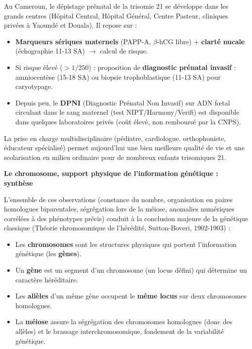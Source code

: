 \documentclass[11pt]{article}
\begin{document}
\begin{savaistu}
Au Cameroun, le dépistage prénatal de la trisomie 21 se développe dans les grands centres (Hôpital Central, Hôpital Général, Centre Pasteur, cliniques privées à Yaoundé et Douala). Il repose sur :
\begin{itemize}
    \item \textbf{Marqueurs sériques maternels} (PAPP-A, $\beta$-hCG libre) + \textbf{clarté nucale} (échographie 11-13 SA) $\rightarrow$ calcul de risque.
    \item Si risque élevé ($> 1/250$) : proposition de \textbf{diagnostic prénatal invasif} : amniocentèse (15-18 SA) ou biopsie trophoblastique (11-13 SA) pour caryotypage.
    \item Depuis peu, le \textbf{DPNI} (Diagnostic Prénatal Non Invasif) sur ADN fœtal circulant dans le sang maternel (test NIPT/Harmony/Verifi) est disponible dans quelques laboratoires privés (coût élevé, non remboursé par la CNPS).
\end{itemize}
La prise en charge multidisciplinaire (pédiatre, cardiologue, orthophoniste, éducateur spécialisé) permet aujourd'hui une bien meilleure qualité de vie et une scolarisation en milieu ordinaire pour de nombreux enfants trisomiques 21.
\end{savaistu}

\textbf{Le chromosome, support physique de l'information génétique : synthèse}\par

L'ensemble de ces observations (constance du nombre, organisation en paires homologues biparentales, ségrégation lors de la méiose, anomalies numériques corrélées à des phénotypes précis) conduit à la conclusion majeure de la génétique classique (Théorie chromosomique de l'hérédité, Sutton-Boveri, 1902-1903) :

\begin{propriete}
\begin{itemize}
    \item Les \textbf{chromosomes} sont les structures physiques qui portent l'information génétique (les \textbf{gènes}).
    \item Un \textbf{gène} est un segment d'un chromosome (un locus défini) qui détermine un caractère héréditaire.
    \item Les \textbf{allèles} d'un même gène occupent le \textbf{même locus} sur deux chromosomes homologues.
    \item La \textbf{méiose} assure la ségrégation des chromosomes homologues (donc des allèles) et le brassage interchromosomique, fondement de la variabilité génétique.
\end{itemize}
\end{propriete}
\end{document}
